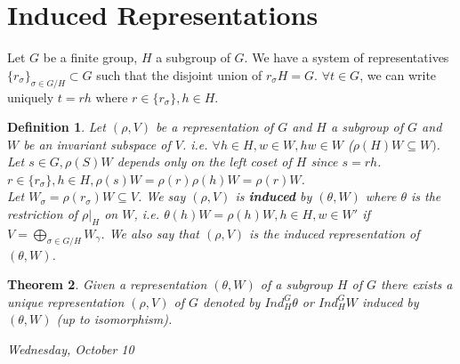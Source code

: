 \documentclass[letterpaper, leqno, 12pt]{article}
\newcommand {\repV} {(\rho,V)}
\theoremstyle{stdthm}
\newtheorem{thm}{Theorem}
\theoremstyle{stddef}
\newtheorem{defn}[thm]{Definition}
\theoremstyle{stdnonum}
\theoremstyle{stdqands}
\theoremstyle{stdbold}
\begin{document}
\section{Induced Representations}

Let $G$ be a finite group, $H$ a subgroup of $G$. We have a system of representatives $\{r_\sigma\}_{\sigma \in G/H} \subset G$ such that the disjoint union of $r_\sigma H = G$. $\forall t \in G$, we can write uniquely $t=rh$ where $r \in \{r_\sigma\}, h \in H$. 

\begin{defn}
Let $\repV$ be a representation of $G$ and $H$ a subgroup of $G$ and $W$ be an invariant subspace of $V$. i.e. $\forall h \in H, w \in W, hw \in W$ ($\rho(H)W \subseteq W)$. Let $s\in G,\rho(S)W$ depends only on the left coset of $H$ since $s =rh$.  $r \in \{r_\sigma\}, h \in H, \rho(s)W = \rho(r)\rho(h)W = \rho(r)W$. \\

Let $W_\sigma = \rho(r_\sigma)W \subseteq V$. We say $\repV$ is {\bf induced} by $(\theta,W)$ where $\theta$ is the restriction of $\rho|_H$ on $W$, i.e. $\theta(h)W = \rho(h)W, h \in H, w \in W'$ if $V = \bigoplus_{\sigma \in G/H} W_\gamma$. We also say that $(\rho,V)$ is the induced representation of $(\theta,W)$. 
\end{defn}

\begin{thm}
Given a representation $(\theta,W)$ of a subgroup $H$ of $G$ there exists a unique representation $(\rho,V)$ of $G$ denoted by $Ind_H^G\theta$ or $Ind_H^G W$ induced by $(\theta, W)$ (up to isomorphism). 
\end{thm}
\newpage
\begin{center}
\emph{Wednesday, October 10}
\end{center}
\end{document}
